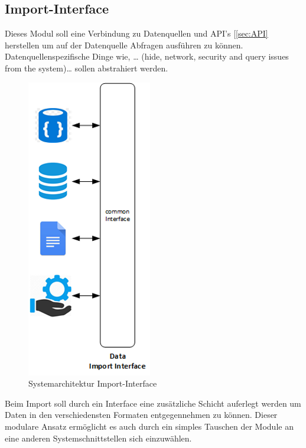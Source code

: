 \subsection{Import-Interface}
Dieses Modul soll eine Verbindung zu Datenquellen und API's [\ref{sec:API} herstellen um auf der Datenquelle Abfragen ausführen zu können. Datenquellenspezifische Dinge wie, … (hide, network, security and query issues from the system)… sollen abstrahiert werden.
\begin{figure}[H]
    \centering
    \includegraphics[scale=1]{images/arch_dataImportInterface.png}
    \caption{Systemarchitektur Import-Interface}
    \label{img:arch_dataImportInterface}
\end{figure}
Beim Import soll durch ein Interface eine zusätzliche Schicht auferlegt werden um Daten
in den verschiedensten Formaten entgegennehmen zu können. Dieser modulare Ansatz
ermöglicht es auch durch ein simples Tauschen der Module an eine anderen
Systemschnittstellen sich einzuwählen. 
